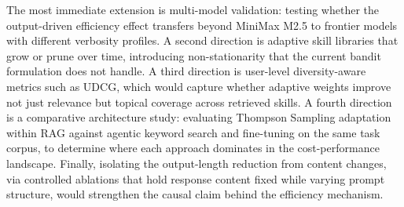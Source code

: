 The most immediate extension is multi-model validation: testing whether the output-driven efficiency effect transfers beyond MiniMax M2.5 to frontier models with different verbosity profiles.
A second direction is adaptive skill libraries that grow or prune over time, introducing non-stationarity that the current bandit formulation does not handle.
A third direction is user-level diversity-aware metrics such as UDCG, which would capture whether adaptive weights improve not just relevance but topical coverage across retrieved skills.
A fourth direction is a comparative architecture study: evaluating Thompson Sampling adaptation within RAG against agentic keyword search and fine-tuning on the same task corpus, to determine where each approach dominates in the cost-performance landscape.
Finally, isolating the output-length reduction from content changes, via controlled ablations that hold response content fixed while varying prompt structure, would strengthen the causal claim behind the efficiency mechanism.
